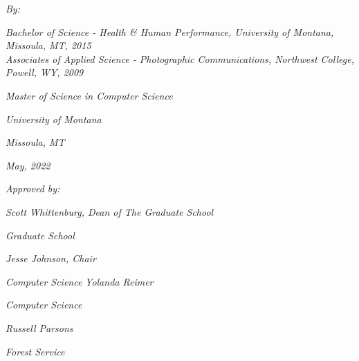 \documentclass[
11pt, %
oneside, %
english, %
singlespacing, %
liststotoc, %
parskip, %
]{MastersDoctoralThesis} %
\author{Trent \textsc{Schweitzer}} %
\begin{document}
\frontmatter %

\pagestyle{plain} %


\begin{titlepage}
\begin{center}

{\LARGE \bfseries \MakeUppercase \ttitle\par}\vspace{0.4cm} %

\begin{minipage}[t]{0.4\textwidth}
\begin{flushleft} \large
\emph{By:}\\
{\authorname} %
\end{flushleft}
\end{minipage}

\vfill

\textit{Bachelor of Science - Health \& Human Performance, University of Montana, Missoula, MT, 2015}\\ %
\textit{Associates of Applied Science - Photographic Communications, Northwest College, Powell, WY, 2009}\\ %
\vfill


\vfill

\textit{Master of Science in Computer Science}
\vfill




\vfill
{\Large\textit{University of Montana}

\textit{Missoula, MT}

\textit{May, 2022}}
\vfill

\textit{Approved by:}


\textit{Scott Whittenburg, Dean of The Graduate School}


\textit{Graduate School}
\vfill

\textit{Jesse Johnson, Chair}

\textit{Computer Science}
\vfill
\textit{Yolanda Reimer}

\textit{Computer Science}

\vfill
\textit{Russell Parsons}

\textit{Forest Service}
\vfill




\vfill

\vfill
\end{center}
\end{titlepage}
\end{document}
